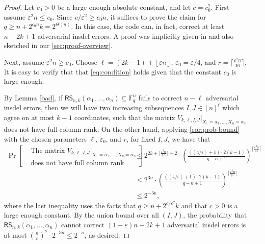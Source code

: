\documentclass[11pt]{article}
\theoremstyle{plain}
\theoremstyle{definition}
\theoremstyle{remark}
\newcommand{\F}{\mathbb{F}}
\newcommand{\eps}{\varepsilon}
\newcommand{\floor}[1]{\left\lfloor #1 \right\rfloor}
\renewcommand{\epsilon}{\varepsilon}
\begin{document}
\begin{proof}
Let $c_0>0$ be a large enough absolute constant, and let $c=c_0^2$.
First assume $\eps^2 n\leq c_0$. Since $c/\eps^2\geq c_0 n$, it suffices to prove the claim for $q\geq n+2^{c_0 n}k=2^{\Theta(n)}$.
In this case, the code can, in fact, correct at least $n-2k+1$ adversarial insdel errors. A proof was implicitly given in \cite[proof of Theorem 16]{con2023reed} and also sketched in our \cref{sec:proof-overview}.

Next, assume $\eps^2 n\geq c_0$.
Choose $\ell=(2k-1) + \floor{\varepsilon n}$, $\eps_0=\eps/4$, and $r=\lceil\frac{\eps^2 n}{16}\rceil$. It is easy to verify that that \eqref{eq:condition} holds given that the constant $c_0$ is large enough.

By Lemma \ref{bad}, if $\mathsf{RS}_{n,k}(\alpha_1,\dots,\alpha_n)\subseteq\F_q^n$ fails to correct $n-\ell$ adversarial insdel errors, then we will have two increasing subsequences $I,J\in[n]^{\ell}$ which agree on at most $k-1$ coordinates, such that the matrix $V_{k,\ell,I, J}|_{X_{1}=\alpha_{1},\dots,X_{n}=\alpha_{n}}$ does not have full column rank. On the other hand, applying \cref{cor:prob-bound} with the chosen parameters $\ell$, $\eps_0$, and $r$, 
for fixed $I,J$, we have that
\begin{align*}
\Pr\left[\begin{aligned}
    &\text{The matrix }V_{k,\ell,I,J}|_{X_1=\alpha_1,\dots,X_{n}=\alpha_{n}}\\
&\text{does not have full column rank}
\end{aligned}\right]&\leq 
2^{2k+\lceil \frac{\varepsilon^2 n}{16}\rceil-2}\cdot\left(\frac{((4/\eps)+1)\cdot 2(k-1)}{q-n+1}\right)^{\lceil\frac{\varepsilon^2 n}{16}\rceil}\\
&\leq 2^{3n}\cdot \left(\frac{((4/\eps)+1)\cdot 2(k-1)}{q-n+1}\right)^{\lceil\frac{\varepsilon^2 n}
{16}\rceil}\\
&\leq 2^{-3n},
\end{align*}
where the last inequality uses the facts that $q\geq n+2^{c/\eps^2} k$ and that $c>0$ is a large enough constant.
By the union bound over all $(I,J)$,
the probability that $\mathsf{RS}_{n,k}(\alpha_1,\dots,\alpha_n)$ cannot correct $(1-\epsilon)n-2k+1$ adversarial insdel errors is at most $\binom{n}{\ell}^2\cdot 2^{-3n}\leq 2^{-n}$, as desired.
\end{proof}




\end{document}
